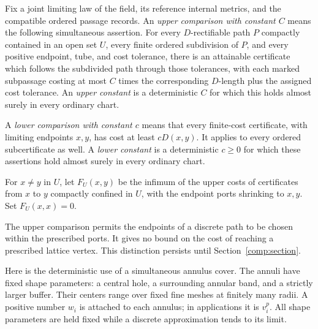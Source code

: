 \begin{definition}
\label{met:port-comparison}
Fix a joint limiting law of the field, its reference internal metrics,
and the compatible ordered passage records.  An \emph{upper comparison with constant
$C$} means the following simultaneous assertion.  For every
$D$-rectifiable path $P$ compactly contained in an open set $U$, every
finite ordered subdivision of $P$, and every positive endpoint, tube,
and cost tolerance, there is an attainable certificate which follows
the subdivided path through those tolerances, with each marked
subpassage costing at most $C$ times the corresponding $D$-length plus
the assigned cost tolerance.  An \emph{upper constant} is a deterministic
$C$ for which this holds almost surely in every ordinary chart.

A \emph{lower comparison with constant $c$} means that every finite-cost
certificate, with limiting endpoints $x,y$, has cost at least $cD(x,y)$.
It applies to every ordered subcertificate as well.  A \emph{lower
constant} is a deterministic $c\geq0$ for which these assertions hold
almost surely in every ordinary chart.

For $x\ne y$ in $U$, let $F_U(x,y)$ be the infimum of the upper costs of
certificates from $x$ to $y$ compactly confined in $U$, with the endpoint
ports shrinking to $x,y$.  Set $F_U(x,x)=0$.
\end{definition}

The upper comparison permits the endpoints of a discrete path to be
chosen within the prescribed ports.  It gives no bound on the cost of
reaching a prescribed lattice vertex.  This distinction persists until
Section~\ref{comp:section}.

Here is the deterministic use of a simultaneous annulus cover.  The
annuli have fixed shape parameters: a central hole, a surrounding
annular band, and a strictly larger buffer.  Their centers range over
fixed fine meshes at finitely many radii.  A positive number $w_i$ is
attached to each annulus; in applications it is $v_i^p$.  All shape
parameters are held fixed while a discrete approximation tends to its
limit.

